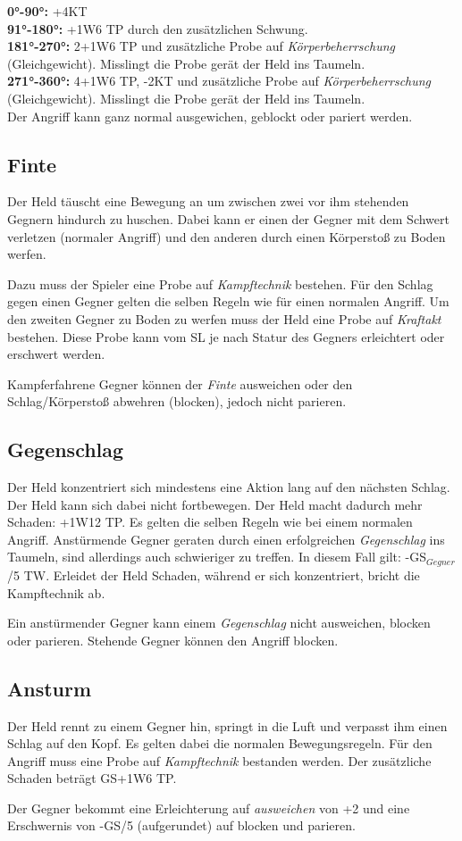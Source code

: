 \textbf{0°-90°:} +4KT \\
\textbf{91°-180°:} +1W6 TP durch den zusätzlichen Schwung. \\
\textbf{181°-270°:} 2+1W6 TP und zusätzliche Probe auf \textit{Körperbeherrschung} (Gleichgewicht). Misslingt die Probe gerät der Held ins Taumeln. \\
\textbf{271°-360°:} 4+1W6 TP, -2KT und zusätzliche Probe auf \textit{Körperbeherrschung} (Gleichgewicht). Misslingt die Probe gerät der Held ins Taumeln. \\

Der Angriff kann ganz normal ausgewichen, geblockt oder pariert werden.

\subsection{Finte}
Der Held täuscht eine Bewegung an um zwischen zwei vor ihm stehenden Gegnern hindurch zu huschen. Dabei kann er einen der Gegner mit dem Schwert verletzen (normaler Angriff) und den anderen durch einen Körperstoß zu Boden werfen.

Dazu muss der Spieler eine Probe auf \textit{Kampftechnik} bestehen. Für den Schlag gegen einen Gegner gelten die selben Regeln wie für einen normalen Angriff. Um den zweiten Gegner zu Boden zu werfen muss der Held eine Probe auf \textit{Kraftakt} bestehen. Diese Probe kann vom SL je nach Statur des Gegners erleichtert oder erschwert werden. 

Kampferfahrene Gegner können der \textit{Finte} ausweichen oder den Schlag/Körperstoß abwehren (blocken), jedoch nicht parieren. 

\subsection{Gegenschlag}
Der Held konzentriert sich mindestens eine Aktion lang auf den nächsten Schlag. Der Held kann sich dabei nicht fortbewegen. Der Held macht dadurch mehr Schaden: +1W12 TP. Es gelten die selben Regeln wie bei einem normalen Angriff. Anstürmende Gegner geraten durch einen erfolgreichen \textit{Gegenschlag} ins Taumeln, sind allerdings auch schwieriger zu treffen. In diesem Fall gilt: -GS$_{Gegner}$/5 TW. Erleidet der Held Schaden, während er sich konzentriert, bricht die Kampftechnik ab.

Ein anstürmender Gegner kann einem \textit{Gegenschlag} nicht ausweichen, blocken oder parieren. Stehende Gegner können den Angriff blocken.

\subsection{Ansturm}
Der Held rennt zu einem Gegner hin, springt in die Luft und verpasst ihm einen Schlag auf den Kopf. Es gelten dabei die normalen Bewegungsregeln. Für den Angriff muss eine Probe auf \textit{Kampftechnik} bestanden werden. Der zusätzliche Schaden beträgt GS+1W6 TP.

Der Gegner bekommt eine Erleichterung auf \textit{ausweichen} von +2 und eine Erschwernis von -GS/5 (aufgerundet) auf blocken und parieren.